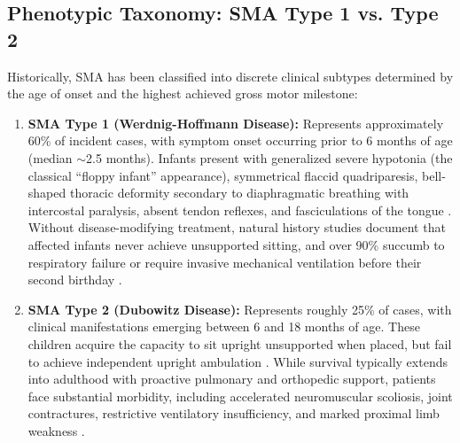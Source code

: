 \documentclass[journal]{IEEEtran}
\begin{document}
\subsection{Phenotypic Taxonomy: SMA Type 1 vs. Type 2}
Historically, SMA has been classified into discrete clinical subtypes determined by the age of onset and the highest achieved gross motor milestone:
\begin{enumerate}
    \item \textbf{SMA Type 1 (Werdnig-Hoffmann Disease):} Represents approximately 60\% of incident cases, with symptom onset occurring prior to 6 months of age (median $\sim$2.5 months). Infants present with generalized severe hypotonia (the classical ``floppy infant'' appearance), symmetrical flaccid quadriparesis, bell-shaped thoracic deformity secondary to diaphragmatic breathing with intercostal paralysis, absent tendon reflexes, and fasciculations of the tongue \cite{devivo2021clinical}. Without disease-modifying treatment, natural history studies document that affected infants never achieve unsupported sitting, and over 90\% succumb to respiratory failure or require invasive mechanical ventilation before their second birthday \cite{sproule2009increased}.
    \item \textbf{SMA Type 2 (Dubowitz Disease):} Represents roughly 25\% of cases, with clinical manifestations emerging between 6 and 18 months of age. These children acquire the capacity to sit upright unsupported when placed, but fail to achieve independent upright ambulation \cite{mercuri2018diagnosis}. While survival typically extends into adulthood with proactive pulmonary and orthopedic support, patients face substantial morbidity, including accelerated neuromuscular scoliosis, joint contractures, restrictive ventilatory insufficiency, and marked proximal limb weakness \cite{coratti2021longitudinal}.
\end{enumerate}
\end{document}
